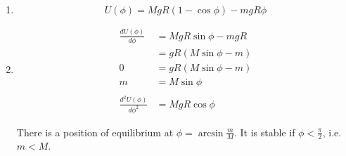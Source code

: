 \documentclass{article}
\begin{document}
\setcounter{subsection}{36}
\subsection{}

\begin{enumerate}
  \item \[U(\phi) = M g R (1 - \cos \phi) - m g R \phi\]

  \item

        \begin{align*}
          \frac{d U(\phi)}{d \phi}     & = M g R \sin \phi - m g R \\
                                       & = g R (M \sin \phi - m)   \\
          0                            & = g R (M \sin \phi - m)   \\
          m                            & = M \sin \phi             \\ \\
          \frac{d^2 U(\phi)}{d \phi^2} & = M g R \cos \phi
        \end{align*}

        There is a position of equilibrium at $\phi = \arcsin \frac{m}{M}$. It is stable if $\phi < \frac{\pi}{2}$, i.e. $m < M$.
\end{enumerate}

\setcounter{subsection}{50}
\subsection{}
\end{document}
